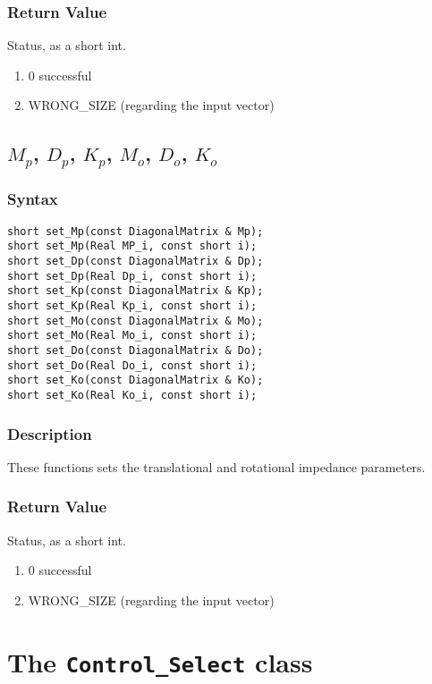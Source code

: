 \documentclass[11pt,fleqn,letterpaper]{report}
\begin{document}
\subsubsection*{Return Value}

Status, as a short int.
\begin{enumerate}
\item[] 0 successful
\item[] WRONG\_SIZE (regarding the input vector)
\end{enumerate}

\newpage

\subsection*{$M_p$, $D_p$, $K_p$, $M_o$, $D_o$, $K_o$}
\subsubsection*{Syntax}
\begin{verbatim}
short set_Mp(const DiagonalMatrix & Mp);
short set_Mp(Real MP_i, const short i);
short set_Dp(const DiagonalMatrix & Dp);
short set_Dp(Real Dp_i, const short i);
short set_Kp(const DiagonalMatrix & Kp);
short set_Kp(Real Kp_i, const short i);
short set_Mo(const DiagonalMatrix & Mo);
short set_Mo(Real Mo_i, const short i);
short set_Do(const DiagonalMatrix & Do);
short set_Do(Real Do_i, const short i);
short set_Ko(const DiagonalMatrix & Ko);
short set_Ko(Real Ko_i, const short i);
\end{verbatim}

\subsubsection*{Description}   
These functions sets the translational and rotational impedance
parameters.
\subsubsection*{Return Value}

Status, as a short int.
\begin{enumerate}
\item[] 0 successful
\item[] WRONG\_SIZE (regarding the input vector)
\end{enumerate}


\newpage

\section{The \texttt{Control\_Select} class}
\end{document}
